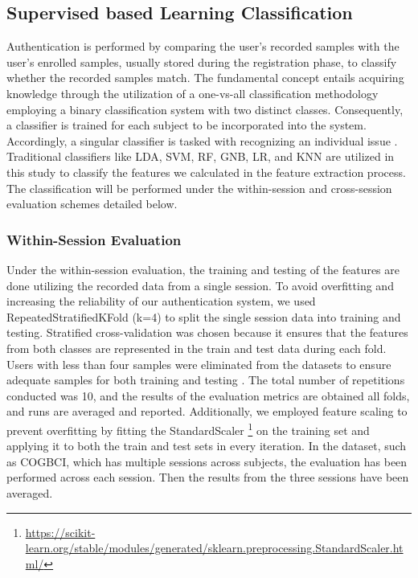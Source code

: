 \subsection{\large Supervised based Learning Classification}
\label{sec:Framework:Classification:Supervised based Learning Classification}
Authentication is performed by comparing the user’s recorded samples with the user’s enrolled samples, usually stored during the registration phase, to classify whether the recorded samples match. The fundamental concept entails acquiring knowledge through the utilization of a one-vs-all classification methodology employing a binary classification system with two distinct classes. Consequently, a classifier is trained for each subject to be incorporated into the system. Accordingly, a singular classifier is tasked with recognizing an individual issue \cite{arias2023performance}. Traditional classifiers like LDA, SVM, RF, GNB, LR, and KNN are utilized in this study to classify the features we calculated in the feature extraction process. The classification will be performed under the within-session and cross-session evaluation schemes detailed below.

\subsubsection{Within-Session Evaluation}
Under the within-session evaluation, the training and testing of the features are done utilizing the recorded data from a single session. To avoid overfitting and increasing the reliability of our authentication system, we used RepeatedStratifiedKFold (k=4) to split the single session data into training and testing. Stratified cross-validation was chosen because it ensures that the features from both classes are represented in the train and test data during each fold. Users with less than four samples were eliminated from the datasets to ensure adequate samples for both training and testing \cite{arias2023performance}. The total number of repetitions conducted was 10, and the results of the evaluation metrics are obtained all folds, and runs are averaged and reported.
Additionally, we employed feature scaling to prevent overfitting by fitting the StandardScaler \footnote{\url{https://scikit-learn.org/stable/modules/generated/sklearn.preprocessing.StandardScaler.html/}} on the training set and applying it to both the train and test sets in every iteration. In the dataset, such as COGBCI, which has multiple sessions across subjects, the evaluation has been performed across each session. Then the results from the three sessions have been averaged. 
\smallskip

